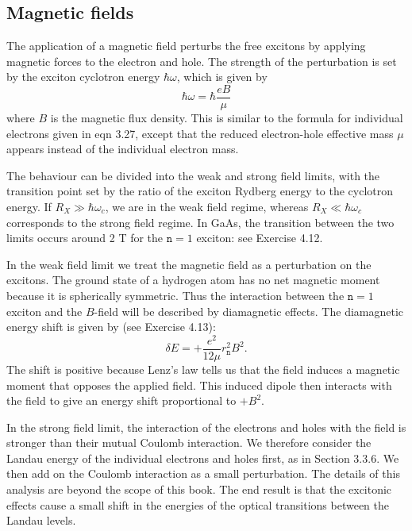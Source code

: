 \documentclass[12pt]{book}
\begin{document}
\subsection{Magnetic fields}

The application of a magnetic field perturbs the free excitons by applying magnetic forces to the electron and hole. The strength of the perturbation is set by the exciton cyclotron energy $\hbar\omega$, which is given by
\begin{equation}\label{equa:4.6}
  \hbar\omega=\hbar\frac{eB}{\mu}
\end{equation}
where $B$ is the magnetic flux density. This is similar to the formula for individual electrons given in eqn 3.27, except that the reduced electron-hole effective mass $\mu$ appears instead of the individual electron mass.

The behaviour can be divided into the weak and strong field  limits, with the transition point set by the ratio of the exciton Rydberg energy to the cyclotron energy. If $R_X\gg \hbar\omega_c$, we are in the weak field regime, whereas $R_X\ll\hbar\omega_c$ corresponds to the strong field regime. In GaAs, the transition between the two limits occurs around 2 T for the $\texttt{n}= 1$ exciton: see Exercise 4.12.

In the weak field limit we treat the magnetic field as a perturbation on the excitons. The ground state of a hydrogen atom has no net magnetic moment because it is spherically symmetric. Thus the interaction between the $\texttt{n} = 1$ exciton and the $B$-field will be described by diamagnetic effects. The diamagnetic energy shift is given by (see Exercise 4.13):
\begin{equation}\label{equa:4.7}
  \delta E=+\frac{e^2}{12\mu}r_{\texttt{n}}^2B^2.
\end{equation}
The shift is positive because Lenz's law tells us that the field induces a magnetic moment that opposes the applied field. This induced dipole then interacts with the field to give an energy shift proportional to $+B^2$.

In the strong field limit, the interaction of the electrons and holes with the field is stronger than their mutual Coulomb interaction. We therefore consider the Landau energy of the individual electrons and holes first, as in Section 3.3.6. We then add on the Coulomb interaction as a small perturbation. The details of this analysis are beyond the scope of this book. The end result is that the excitonic effects cause a small shift in the energies of the optical transitions between the Landau levels.
\end{document}
